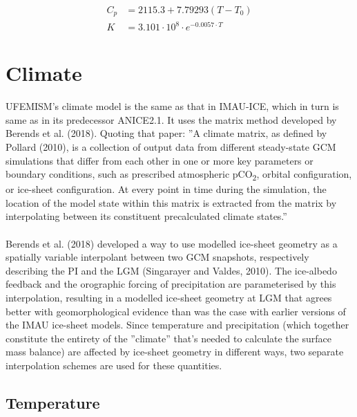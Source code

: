 \documentclass{article}
\begin{document}
\begin{align}
C_p &= 2115.3 + 7.79293 \left( T - T_0\right) \\
K &= 3.101 \cdot 10^8 \cdot e^{-0.0057 \cdot T}
\end{align}

\newpage
\section{Climate}

UFEMISM's climate model is the same as that in IMAU-ICE, which in turn is same as in its predecessor ANICE2.1. It uses the matrix method developed by Berends et al. (2018). Quoting that paper: ''A climate matrix, as defined by Pollard (2010), is a collection of output data from different steady-state GCM simulations that differ from each other in one or more key parameters or boundary conditions, such as prescribed atmospheric pCO\textsubscript{2}, orbital configuration, or ice-sheet configuration. At every point in time during the simulation, the location of the model state within this matrix is extracted from the matrix by interpolating between its constituent precalculated climate states.''\\
\\
Berends et al. (2018) developed a way to use modelled ice-sheet geometry as a spatially variable interpolant between two GCM snapshots, respectively describing the PI and the LGM (Singarayer and Valdes, 2010). The ice-albedo feedback and the orographic forcing of precipitation are parameterised by this interpolation, resulting in a modelled ice-sheet geometry at LGM that agrees better with geomorphological evidence than was the case with earlier versions of the IMAU ice-sheet models. Since temperature and precipitation (which together constitute the entirety of the ''climate'' that's needed to calculate the surface mass balance) are affected by ice-sheet geometry in different ways, two separate interpolation schemes are used for these quantities.\\

\subsection{Temperature}
\end{document}
